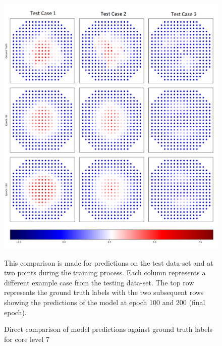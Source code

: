 \begin{figure}[p]
	\centering
	\includegraphics[scale=0.45]{Figures/preds_layer_7.png}
	\caption{Direct comparison of model predictions against ground truth labels for core level 7} {This comparison is made for predictions on the test data-set and at two points during the training process. Each column represents a different example case from the testing data-set. The top row represents the ground truth labels with the two subsequent rows showing the predictions of the model at epoch 100 and 200 (final epoch). }
	\label{fig:preds_layer_7}
\end{figure}

